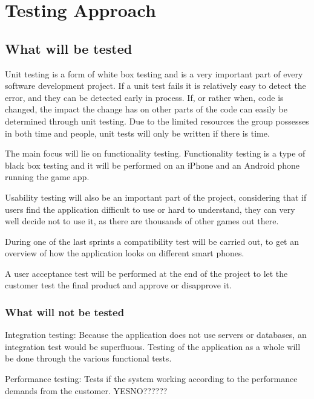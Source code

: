 \section{Testing Approach}

\subsection{What will be tested}

	Unit testing is a form of white box testing and is a very important part of every software development project. If a unit test fails it is relatively easy to detect the error, and they can be detected early in process. If, or rather when, code is changed, the impact the change has on other parts of the code can easily be determined through unit testing. Due to the limited resources
	the group possesses in both time and people, unit tests will only be written if there is time. 

	The main focus will lie on functionality testing. Functionality testing is a type of black box testing and it will be performed on an iPhone and an Android phone running the game app.

	Usability testing will also be an important part of the project, considering that if users find the application difficult to use or hard to understand, they can very well decide not to use it, as there are thousands of other games out there.

	During one of the last sprints a compatibility test will be carried out, to get an overview of how the application looks on different smart phones.

	A user acceptance test will be performed at the end of the project to let the customer test the final product and
	approve or disapprove it.

\subsubsection{What will not be tested}

	Integration testing: Because the application does not use servers or databases, an integration test would be superfluous. Testing of the application as a whole will be done through the various functional tests.

	Performance testing: Tests if the system working according to the performance demands from the customer. YESNO??????
